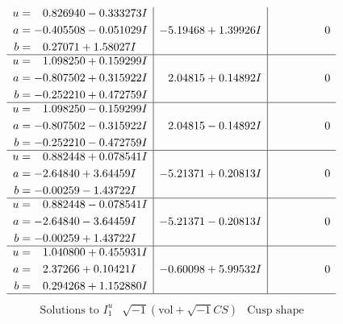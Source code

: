 \documentclass[1p]{elsarticle_modified}
\theoremstyle{definition}
\newcommand{\I}{\sqrt{-1}}
\begin{document}
$$\begin{array}{c|c|c}
\begin{aligned}
u &= \phantom{-}0.826940 - 0.333273 I \\
a &= -0.405508 - 0.051029 I \\
b &= \phantom{-}0.27071 + 1.58027 I\end{aligned}
 & -5.19468 + 1.39926 I & \phantom{-0.000000 } 0 \\ \hline\begin{aligned}
u &= \phantom{-}1.098250 + 0.159299 I \\
a &= -0.807502 + 0.315922 I \\
b &= -0.252210 + 0.472759 I\end{aligned}
 & \phantom{-}2.04815 + 0.14892 I & \phantom{-0.000000 } 0 \\ \hline\begin{aligned}
u &= \phantom{-}1.098250 - 0.159299 I \\
a &= -0.807502 - 0.315922 I \\
b &= -0.252210 - 0.472759 I\end{aligned}
 & \phantom{-}2.04815 - 0.14892 I & \phantom{-0.000000 } 0 \\ \hline\begin{aligned}
u &= \phantom{-}0.882448 + 0.078541 I \\
a &= -2.64840 + 3.64459 I \\
b &= -0.00259 - 1.43722 I\end{aligned}
 & -5.21371 + 0.20813 I & \phantom{-0.000000 } 0 \\ \hline\begin{aligned}
u &= \phantom{-}0.882448 - 0.078541 I \\
a &= -2.64840 - 3.64459 I \\
b &= -0.00259 + 1.43722 I\end{aligned}
 & -5.21371 - 0.20813 I & \phantom{-0.000000 } 0 \\ \hline\begin{aligned}
u &= \phantom{-}1.040800 + 0.455931 I \\
a &= \phantom{-}2.37266 + 0.10421 I \\
b &= \phantom{-}0.294268 + 1.152880 I\end{aligned}
 & -0.60098 + 5.99532 I & \phantom{-0.000000 } 0\\
 \hline 
 \end{array}$$\newpage$$\begin{array}{c|c|c}  
\text{Solutions to }I^u_{1}& \I (\text{vol} + \sqrt{-1}CS) & \text{Cusp shape}\\
 \hline 
\begin{aligned}

\end{aligned}
\end{array}$$
\end{document}
